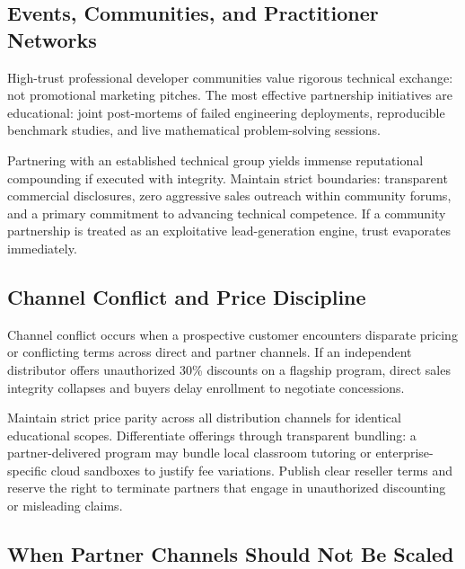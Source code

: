 \subsection{Events, Communities, and Practitioner Networks}
\label{sec:events_communities_practitioner_networks}

High-trust professional developer communities value rigorous technical exchange: not promotional marketing pitches. The most effective partnership initiatives are educational: joint post-mortems of failed engineering deployments, reproducible benchmark studies, and live mathematical problem-solving sessions.

Partnering with an established technical group yields immense reputational compounding if executed with integrity. Maintain strict boundaries: transparent commercial disclosures, zero aggressive sales outreach within community forums, and a primary commitment to advancing technical competence. If a community partnership is treated as an exploitative lead-generation engine, trust evaporates immediately.

\subsection{Channel Conflict and Price Discipline}
\label{sec:channel_conflict_price_discipline}

Channel conflict occurs when a prospective customer encounters disparate pricing or conflicting terms across direct and partner channels. If an independent distributor offers unauthorized 30\% discounts on a flagship program, direct sales integrity collapses and buyers delay enrollment to negotiate concessions.

Maintain strict price parity across all distribution channels for identical educational scopes. Differentiate offerings through transparent bundling: a partner-delivered program may bundle local classroom tutoring or enterprise-specific cloud sandboxes to justify fee variations. Publish clear reseller terms and reserve the right to terminate partners that engage in unauthorized discounting or misleading claims.

\subsection{When Partner Channels Should Not Be Scaled}
\label{sec:when_not_to_scale_partner_channels}

